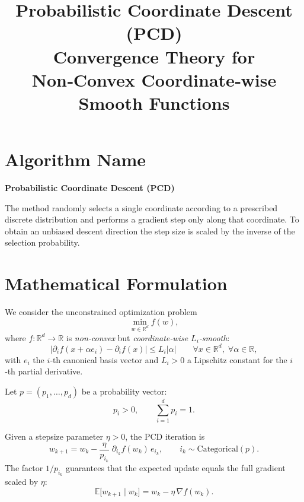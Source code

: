 \documentclass{article}
\begin{document}
\title{Probabilistic Coordinate Descent (PCD)\\
Convergence Theory for Non‑Convex Coordinate‑wise Smooth Functions}
\author{}
\date{}
\maketitle

\section*{Algorithm Name}
\textbf{Probabilistic Coordinate Descent (PCD)}  

The method randomly selects a single coordinate according to a prescribed discrete distribution and performs a gradient step only along that coordinate.  To obtain an unbiased descent direction the step size is scaled by the inverse of the selection probability.

\section*{Mathematical Formulation}
We consider the unconstrained optimization problem
\[
\min_{w\in\mathbb{R}^{d}} f(w),
\]
where $f:\mathbb{R}^{d}\!\to\!\mathbb{R}$ is \emph{non‑convex} but \emph{coordinate‑wise $L_i$‑smooth}:
\begin{equation}
\label{eq:coord_smooth}
\bigl|\partial_i f(x+\alpha e_i)-\partial_i f(x)\bigr|\le L_i|\alpha|
\qquad\forall x\in\mathbb{R}^{d},\;\forall\alpha\in\mathbb{R},
\end{equation}
with $e_i$ the $i$‑th canonical basis vector and $L_i>0$ a Lipschitz constant for the $i$‑th partial derivative.

Let $p=(p_1,\dots,p_d)$ be a probability vector:
\[
p_i>0,\qquad \sum_{i=1}^{d}p_i=1 .
\]

Given a stepsize parameter $\eta>0$, the PCD iteration is
\begin{equation}
\label{eq:update}
w_{k+1}= w_k-\frac{\eta}{p_{i_k}}\;\partial_{i_k} f(w_k)\,e_{i_k},
\qquad i_k\sim \text{Categorical}(p).
\end{equation}
The factor $1/p_{i_k}$ guarantees that the expected update equals the full gradient scaled by $\eta$:
\[
\mathbb{E}\!\bigl[w_{k+1}\mid w_k\bigr]=w_k-\eta\,\nabla f(w_k).
\]

\end{document}
